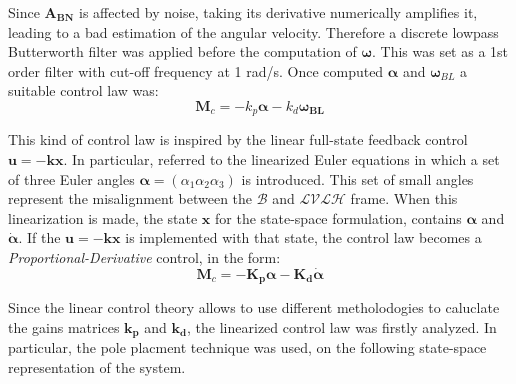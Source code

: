 Since $\boldsymbol{A_{BN}}$ is affected by noise, taking its derivative numerically amplifies it, leading to a bad estimation of the angular velocity. Therefore a discrete lowpass Butterworth filter was applied before the computation of $\boldsymbol{\omega}$. This was set as a 1st order filter with cut-off frequency at 1 rad/s. Once computed $\boldsymbol{\alpha}$ and $\boldsymbol{\omega}_{BL}$ a suitable control law was: 
$$\boldsymbol{M}_c=-k_p\boldsymbol{\alpha}-k_d\boldsymbol{{\omega}_{BL}}$$

This kind of control law is inspired by the linear full-state feedback control  $\boldsymbol{u} = -\boldsymbol{kx} $. In particular, referred to the linearized Euler equations in which a set of three Euler angles $\boldsymbol{\alpha} = \left(\alpha_1 \alpha_2 \alpha_3 \right)$ is introduced. This set of small angles represent the misalignment between the $\mathcal{B}$ and $\mathcal{LVLH}$ frame. When this linearization is made, the state $\boldsymbol{x}$ for the state-space formulation, contains $\boldsymbol{\alpha}$ and $\dot{\boldsymbol{\alpha}}$. If the $\boldsymbol{u} = -\boldsymbol{kx} $ is implemented with that state, the control law becomes a \textit{Proportional-Derivative} control, in the form:
$$\boldsymbol{M}_c=-\boldsymbol{K_p}\boldsymbol{\alpha}-\boldsymbol{K_d}\dot{\boldsymbol{\alpha}}$$

Since the linear control theory allows to use different metholodogies to caluclate the gains matrices $\boldsymbol{k_p}$ and $\boldsymbol{k_d}$, the linearized control law was firstly analyzed. In particular, the pole placment technique was used, on the following state-space representation of the system. 

